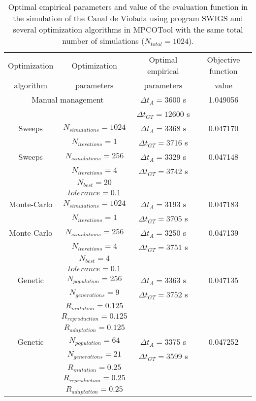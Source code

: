 \documentclass[review,authoryear]{elsarticle}
\newcommand{\TABLE}[5]
{
	\begin{table}[ht!]
		\centering
		\caption{#4.\label{#5}}
		#1
		\begin{tabular}{#2}
			#3
		\end{tabular}
	\end{table}
}
\begin{document}
\TABLE{\scriptsize}{cccc}
{
	Optimization & Optimization & Optimal empirical & Objective function
	\\ algorithm & parameters & parameters & value
	\\ \hline
	\multicolumn{2}{c}{Manual management} & $\Delta t_A=3600$ s & 1.049056
	\\ & & $\Delta t_{GT}=12600$ s
	\\ \hline
	Sweeps & $N_{simulations}=1024$ & $\Delta t_A=3368$ s & 0.047170
	\\ & $N_{iterations}=1$ & $\Delta t_{GT}=3716$ s
	\\ \hline
	Sweeps & $N_{simulations}=256$ & $\Delta t_A=3329$ s & 0.047148
	\\ & $N_{iterations}=4$ & $\Delta t_{GT}=3742$ s
	\\ & $N_{best}=20$ &
	\\ & $tolerance=0.1$
	\\ \hline
	Monte-Carlo & $N_{simulations}=1024$ & $\Delta t_A=3193$ s & 0.047183
	\\ & $N_{iterations}=1$ & $\Delta t_{GT}=3705$ s
	\\ \hline
	Monte-Carlo & $N_{simulations}=256$ & $\Delta t_A=3250$ s & 0.047139
	\\ & $N_{iterations}=4$ & $\Delta t_{GT}=3751$ s
	\\ & $N_{best}=4$
	\\ & $tolerance=0.1$
	\\ \hline
	Genetic & $N_{population}=256$ & $\Delta t_A=3363$ s & 0.047135
	\\ & $N_{generations}=9$ & $\Delta t_{GT}=3752$ s
	\\ & $R_{mutation}=0.125$
	\\ & $R_{reproduction}=0.125$
	\\ & $R_{adaptation}=0.125$
	\\ \hline
	Genetic & $N_{population}=64$ & $\Delta t_A=3375$ s & 0.047252
	\\ & $N_{generations}=21$ & $\Delta t_{GT}=3599$ s
	\\ & $R_{mutation}=0.25$
	\\ & $R_{reproduction}=0.25$
	\\ & $R_{adaptation}=0.25$
	\\ \hline
}{Optimal empirical parameters and value of the evaluation function in the simulation of the Canal de Violada using program SWIGS and several optimization algorithms in MPCOTool with the same total number of simulations ($N_{total}=1024$)}
{TabSwigs}
\end{document}
